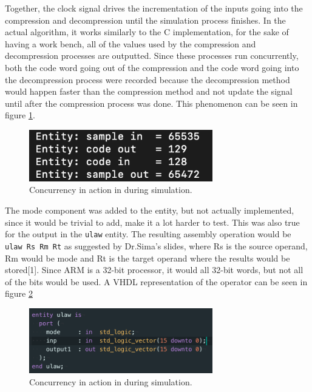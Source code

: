 \documentclass[12pt]{article}
\begin{document}
Together, the clock signal drives the incrementation of the inputs going into the compression and decompression until the simulation process finishes. In the actual algorithm, it works similarly to the C implementation, for the sake of having a work bench, all of the values used by the compression and decompression processes are outputted. Since these processes run concurrently, both the code word going out of the compression and the code word going into the decompression process were recorded because the decompression method would happen faster than the compression method and not update the signal until after the compression process was done. This phenomenon can be seen in figure \ref{fig:concur}.\\

\begin{figure}[!h]
		\centering
        \includegraphics[width=8cm]
        {concur.png}
        \caption{\label{fig:concur} Concurrency in action in during simulation.}
\end{figure}

The mode component was added to the entity, but not actually implemented, since it would be trivial to add, make it a lot harder to test. This was also true for the output in the \texttt{ulaw} entity. The resulting assembly operation would be \texttt{ulaw Rs Rm Rt} as suggested by Dr.Sima's slides, where Rs is the source operand, Rm would be mode and Rt is the target operand where the results would be stored[1]. Since ARM is a 32-bit processor, it would all 32-bit words, but not all of the bits would be used. A VHDL representation of the operator can be seen in figure \ref{fig:ulaw_entity}

\begin{figure}[!h]
		\centering
        \includegraphics[width=8cm]
        {ulaw_entity.png}
        \caption{\label{fig:ulaw_entity} Concurrency in action in during simulation.}
\end{figure}
\newpage
\end{document}
